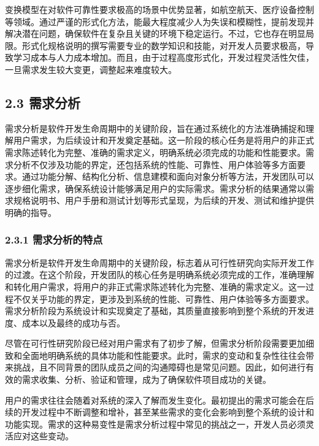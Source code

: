 变换模型在对软件可靠性要求极高的场景中优势显著，如航空航天、医疗设备控制等领域。通过严谨的形式化方法，能最大程度减少人为失误和模糊性，提前发现并解决潜在问题，确保软件在复杂且关键的环境下稳定运行。不过，它也存在明显局限。形式化规格说明的撰写需要专业的数学知识和技能，对开发人员要求极高，导致学习成本与人力成本增加。而且，由于过程高度形式化，开发过程灵活性欠佳，一旦需求发生较大变更，调整起来难度较大。

\hypertarget{ux9700ux6c42ux5206ux6790}{%
\subsection{2.3 需求分析}\label{ux9700ux6c42ux5206ux6790}}

需求分析是软件开发生命周期中的关键阶段，旨在通过系统化的方法准确捕捉和理解用户需求，为后续设计和开发奠定基础。这一阶段的核心任务是将用户的非正式需求陈述转化为完整、准确的需求定义，明确系统必须完成的功能和性能要求。需求分析不仅涉及功能的界定，还包括系统的性能、可靠性、用户体验等多方面要求。通过功能分解、结构化分析、信息建模和面向对象分析等方法，开发团队可以逐步细化需求，确保系统设计能够满足用户的实际需求。需求分析的结果通常以需求规格说明书、用户手册和测试计划等形式呈现，为后续的开发、测试和维护提供明确的指导。

\hypertarget{ux9700ux6c42ux5206ux6790ux7684ux7279ux70b9}{%
\subsubsection{2.3.1 需求分析的特点}\label{ux9700ux6c42ux5206ux6790ux7684ux7279ux70b9}}

需求分析是软件开发生命周期中的关键阶段，标志着从可行性研究向实际开发工作的过渡。在这个阶段，开发团队的核心任务是明确系统必须完成的工作，准确理解和转化用户需求，将用户的非正式需求陈述转化为完整、准确的需求定义。这一过程不仅关乎功能的界定，更涉及到系统的性能、可靠性、用户体验等多方面要求。需求分析阶段为系统设计和实现奠定了基础，其质量直接影响到整个系统的开发进度、成本以及最终的成功与否。

尽管在可行性研究阶段已经对用户需求有了初步了解，但需求分析阶段需要更加细致和全面地明确系统的具体功能和性能要求。此时，需求的变动和复杂性往往会带来挑战，且不同背景的团队成员之间的沟通障碍也是常见问题。因此，如何进行有效的需求收集、分析、验证和管理，成为了确保软件项目成功的关键。


用户的需求往往会随着对系统的深入了解而发生变化。最初提出的需求可能会在后续的开发过程中不断调整和增补，甚至某些需求的变化会影响到整个系统的设计和功能实现。需求的这种易变性是需求分析过程中常见的挑战之一，开发人员必须灵活应对这些变动。

